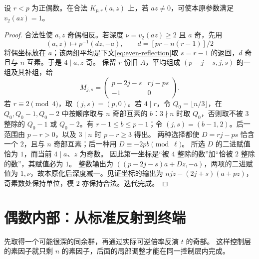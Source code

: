 \begin{lemma}[降低二进深度]\label{lem:binary-depth}
设 $r<p$ 为正偶数。在合法 $K_{p,r}(a,z)$ 上，若 $az\ne0$，可使本原参数满足 $v_2(az)=1$。
\end{lemma}
\begin{proof}
合法性使 $a,z$ 奇偶相反。若深度 $\nu=v_2(az)\ge2$ 且 $a$ 奇，先用
\[
(a,z)\mapsto p^{-1}(dz,-a),\qquad d=[pr-n(r-1)]/2
\]
将偶坐标放在 $a$；该两组平均是下文\eqref{eq:even-reflection}取 $s=r-1$ 的返回，$d$ 奇且与 $n$ 互素。于是 $4\mid a,z$ 奇。
保留 $r$ 份旧 $A$，平均组成 $(p-j-s,j,s)$ 的一组及其补组，给
\[
M_{j,s}=\begin{pmatrix}p-2j-s&rj-ps\\-1&0\end{pmatrix}.
\]
若 $r\equiv2\pmod4$，取 $(j,s)=(p,0)$。若 $4\mid r$，令 $Q_0=\lfloor n/3\rfloor$，在 $Q_0,Q_0-1,Q_0-2$ 中按顺序取与 $n$ 奇部互素的 $b$：$3\nmid n$ 时取 $Q_0$，否则取不被 $3$ 整除的 $Q_0-1$ 或 $Q_0-2$。有 $r-1\le b\le p-1$；令 $(j,s)=(b-1,2)$。后一范围由 $p-r>0$，以及 $3\mid n$ 时 $p-r\ge3$ 得出。
两种选择都使 $D=rj-ps$ 恰含一个 $2$，且与 $n$ 奇部互素；后一种用 $D\equiv-2pb\pmod\ell$。
所选 $D$ 的二进赋值恰为 $1$，而当前 $4\mid a$、$z$ 为奇数。
因此第一坐标是“被 $4$ 整除的数”加“恰被 $2$ 整除的数”，其赋值必为 $1$。
整数输出为 $((p-2j-s)a+Dz,-a)$，两项的二进赋值为 $1,\nu$，故本原化后深度减一。见证坐标的输出为 $njz-(2j+s)(a+pz)$，奇素数处保持单位，模 $2$ 亦保持合法。迭代完成。
\end{proof}


\section{偶数内部：从标准反射到终端}
先取得一个可能很深的同余群，再通过实际可逆倍率反演 $t$ 的奇部。
这样控制层的素因子就只剩 $n$ 的素因子，后面的局部调整才能在同一控制层内完成。

